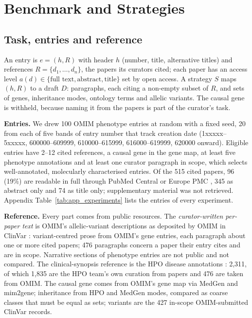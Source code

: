\documentclass{article} %
\begin{document}
\section{Benchmark and Strategies}
\label{sec:method}
\subsection{Task, entries and reference}
\label{sec:task}
An entry is $e=(h,R)$ with header $h$ (number, title, alternative titles) and references $R=\{d_1,\dots,d_n\}$, the papers its curators cited; each paper has an access level $a(d)\in\{\text{full text},\text{abstract},\text{title}\}$ set by open access. A strategy $S$ maps $(h,R)$ to a draft $D$: paragraphs, each citing a non-empty subset of $R$, and sets of genes, inheritance modes, ontology terms and allelic variants. The causal gene is withheld, because naming it from the papers is part of the curator's task.

\textbf{Entries.} We drew 100 OMIM phenotype entries at random with a fixed seed, 20 from each of five bands of entry number that track creation date (1xxxxx--5xxxxx, 600000--609999, 610000--615999, 616000--619999, 620000 onward). Eligible entries have 2--12 cited references, a causal gene in the gene map, at least five phenotype annotations and at least one curator paragraph in scope, which selects well-annotated, molecularly characterised entries. Of the 515 cited papers, 96 (19\%) are readable in full through PubMed Central or Europe PMC \citep{rosonovski2024europe}, 345 as abstract only and 74 as title only; supplementary material was not retrieved. Appendix Table~\ref{tab:app_experiments} lists the entries of every experiment.

\textbf{Reference.} Every part comes from public resources. The \emph{curator-written per-paper text} is OMIM's allelic-variant descriptions as deposited by OMIM in ClinVar \citep{landrum2025clinvar}: variant-centred prose from OMIM's gene entries, each paragraph about one or more cited papers; 476 paragraphs concern a paper their entry cites and are in scope. Narrative sections of phenotype entries are not public and not compared. The clinical-synopsis reference is the HPO disease annotations \citep{gargano2024human}: 2,311, of which 1,835 are the HPO team's own curation from papers and 476 are taken from OMIM. The causal gene comes from OMIM's gene map via MedGen \citep{Louden2020MedgenNcbis} and mim2gene; inheritance from HPO and MedGen modes, compared as coarse classes that must be equal as sets; variants are the 427 in-scope OMIM-submitted ClinVar records.
\end{document}
